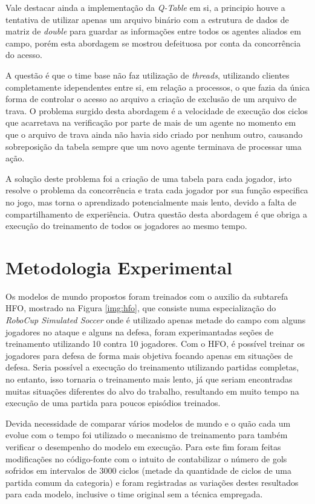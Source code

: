 Vale destacar ainda a implementação da \textit{Q-Table} em si, a principio houve
a tentativa de utilizar apenas um arquivo binário com a estrutura de dados de
matriz de \textit{double} para guardar as informações entre todos os agentes
aliados  em campo, porém esta abordagem se mostrou defeituosa por conta da
concorrência do acesso.

A questão é que o time base não faz utilização de \textit{threads}, utilizando
clientes completamente idependentes entre si, em relação a processos, o que
fazia da única forma de controlar o acesso ao arquivo a criação de exclusão de
um arquivo de trava. O problema surgido desta abordagem é a velocidade de
execução dos ciclos que acarretava na verificação por parte de mais de um agente
no momento em que o arquivo de trava ainda não havia sido criado por nenhum
outro, causando sobreposição da tabela sempre que um novo agente terminava de
processar uma ação.

A solução deste problema foi a criação de uma tabela para cada jogador, isto
resolve  o problema da concorrência e trata cada jogador por sua função
especifica no jogo, mas torna o aprendizado potencialmente mais
lento, devido a falta de compartilhamento de experiência. Outra questão desta
abordagem é que obriga a execução do treinamento de todos os jogadores ao mesmo tempo.

\section{Metodologia Experimental}\label{meotodologia}

Os modelos de mundo propostos foram treinados com o auxilio da subtarefa HFO,
mostrado na Figura \ref{img:hfo}, que consiste numa especialização do
\textit{RoboCup Simulated Soccer} onde é utilizado apenas metade do campo com
alguns jogadores no ataque e alguns na defesa, foram experimantadas seções de
treinamento utilizando 10 contra 10 jogadores. Com o HFO, é
possível treinar os jogadores para defesa de forma mais objetiva focando apenas
em situações de defesa. Seria possível a execução do treinamento utilizando
partidas completas, no entanto, isso tornaria o treinamento mais lento, já que
seriam encontradas muitas situações diferentes do alvo do trabalho,
resultando em muito tempo na execução de uma partida para poucos episódios
treinados.


Devida necessidade de comparar vários modelos de mundo e o quão cada um evolue com o
tempo foi utilizado o mecanismo de treinamento para também verificar o
desempenho do modelo em execução. Para este fim foram feitas modificações no
código-fonte com o intuito de contabilizar o número de gols sofridos em
intervalos de 3000 ciclos (metade da quantidade de ciclos de uma partida comum
da categoria) e foram registradas as variações destes resultados para cada
modelo, inclusive o time original sem a técnica empregada.